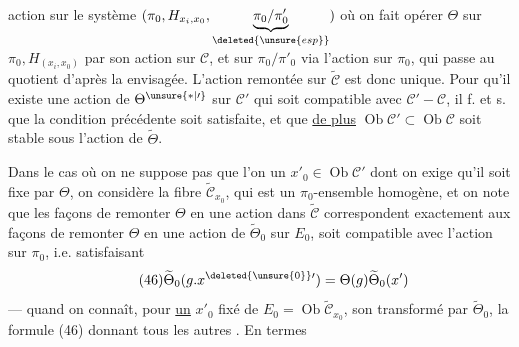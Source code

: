 action sur  le système $(\pi_0,H_{x_i,x_0},\underbrace{\pi_0/\pi'_0}_{\deleted{\unsure{esp}}})$ où on fait opérer $\Theta$ sur $\pi_0,H_{(x_i,x_0)}$ par son action sur $\mathcal C$, et sur $\pi_0/\pi'_0$ via l'action sur $\pi_0$, qui passe au quotient d'après la    envisagée. L'action  remontée   sur $\widetilde{\mathcal C}$ est donc unique. Pour qu'il existe une action de $\Theta^{\unsure{*|\prime}}$ sur $\mathcal C'$ qui soit compatible avec $\mathcal C'-\mathcal C$, il f. et s. que la condition précédente soit satisfaite, et que \uline{de plus} $\operatorname{Ob}\mathcal C'\subset\operatorname{Ob}\mathcal C$ soit stable sous  l'action de $\widetilde\Theta$.

Dans le cas où on ne suppose pas que l'on   un $x'_0\in\operatorname{Ob}\mathcal C'$ dont on exige qu'il soit fixe par $\Theta$, on considère la fibre  $\widetilde{\mathcal C}_{x_0}$, qui est un $\pi_0$-ensemble  homogène, et on note que les façons de remonter $\Theta$ en une action \inserted{$\widetilde\Theta$} dans $\widetilde{\mathcal C}$ correspondent  exactement aux façons de remonter $\Theta$ en une action de $\widetilde\Theta_0$ sur $E_0$,  soit compatible avec l'action sur $\pi_0$, i.e. satisfaisant
\[
\tag{46}\widetilde\Theta_0(g.x^{\deleted{\unsure{0}}\prime})=\Theta(g)\widetilde\Theta_0(x')
\]
---   quand on connaît, pour \uline{un} $x'_0$ fixé de $E_0=\operatorname{Ob}\widetilde{\mathcal C}_{x_0}$, son transformé par $\widetilde\Theta_0$, la formule (46) donnant tous les autres . En termes
